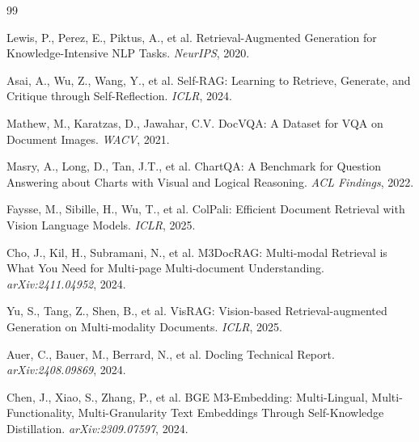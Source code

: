 ﻿\documentclass[UTF8, heading=true]{ctexart}
\begin{document}
\begin{thebibliography}{99}

Lewis, P., Perez, E., Piktus, A., et al.
\newblock Retrieval-Augmented Generation for Knowledge-Intensive NLP Tasks.
\newblock \emph{NeurIPS}, 2020.

Asai, A., Wu, Z., Wang, Y., et al.
\newblock Self-RAG: Learning to Retrieve, Generate, and Critique through Self-Reflection.
\newblock \emph{ICLR}, 2024.

Mathew, M., Karatzas, D., Jawahar, C.V.
\newblock DocVQA: A Dataset for VQA on Document Images.
\newblock \emph{WACV}, 2021.

Masry, A., Long, D., Tan, J.T., et al.
\newblock ChartQA: A Benchmark for Question Answering about Charts with Visual and Logical Reasoning.
\newblock \emph{ACL Findings}, 2022.

Faysse, M., Sibille, H., Wu, T., et al.
\newblock ColPali: Efficient Document Retrieval with Vision Language Models.
\newblock \emph{ICLR}, 2025.

Cho, J., Kil, H., Subramani, N., et al.
\newblock M3DocRAG: Multi-modal Retrieval is What You Need for Multi-page Multi-document Understanding.
\newblock \emph{arXiv:2411.04952}, 2024.

Yu, S., Tang, Z., Shen, B., et al.
\newblock VisRAG: Vision-based Retrieval-augmented Generation on Multi-modality Documents.
\newblock \emph{ICLR}, 2025.

Auer, C., Bauer, M., Berrard, N., et al.
\newblock Docling Technical Report.
\newblock \emph{arXiv:2408.09869}, 2024.

Chen, J., Xiao, S., Zhang, P., et al.
\newblock BGE M3-Embedding: Multi-Lingual, Multi-Functionality, Multi-Granularity Text Embeddings Through Self-Knowledge Distillation.
\newblock \emph{arXiv:2309.07597}, 2024.

\end{thebibliography}
\end{document}
